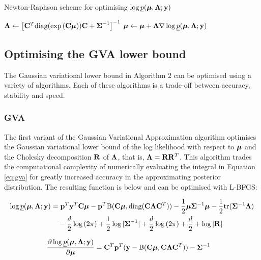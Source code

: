 \documentclass{article}[12pt]
\begin{document}
\begin{algorithm}\label{alg:algorithm_three}
\caption[Algorithm 3]{Newton-Raphson scheme for optimising $\log \underline{p}({\boldsymbol \mu}, {\boldsymbol \Lambda}; {\bf y})$}
\begin{algorithmic}
\STATE ${\boldsymbol \Lambda} \leftarrow \left [{\bf C}^T \text{diag}(\exp{({\bf C}{\boldsymbol\mu})}) {\bf C} + {\boldsymbol \Sigma}^{-1} \right ]^{-1}$
\STATE ${\boldsymbol \mu} \leftarrow {\boldsymbol\mu} + {\boldsymbol \Lambda} \nabla \log \underline{p}({\boldsymbol \mu}, {\boldsymbol \Lambda}; {\bf y})$
\ENDWHILE
\end{algorithmic}
\end{algorithm}

\subsection{Optimising the GVA lower bound}
The Gaussian variational lower bound in Algorithm 2 can be optimised using a 
variety of algorithms. Each of these algorithms is a trade-off between accuracy, 
stability and speed.

\subsubsection{GVA}
The first variant of the Gaussian Variational Approximation algorithm
optimises the Gaussian variational lower bound of the log likelihood with respect
to ${\boldsymbol \mu}$ and the Cholesky decomposition ${\bf R}$ of ${\boldsymbol \Lambda}$, that is,
${\boldsymbol \Lambda} = {\bf R} {\bf R}^T$. This algorithm trades the computational complexity of 
numerically evaluating the integral in Equation \ref{eq:gva} for greatly increased 
accuracy in the approximating posterior distribution. The resulting function is below and 
can be optimised with L-BFGS:

\begin{align}\label{eq:gva}
\log \underline{p}({\boldsymbol \mu}, {\boldsymbol \Lambda}; {\bf y}) &= {\bf p}^T{\bf y}^T{\bf C} {\boldsymbol \mu} - {\bf p}^T {\text{B}}({\bf C} {\boldsymbol \mu}, \text{diag}({\bf C} {\boldsymbol \Lambda} {\bf C}^T)) - {\frac{1}{2}} {\boldsymbol \mu} {\boldsymbol \Sigma}^{-1} {\boldsymbol \mu} - {\frac{1}{2}} \text{tr}{({\boldsymbol\Sigma}^{-1} {\boldsymbol\Lambda})} \\
&\quad - \frac{d}{2} \log{(2 \pi)} + {\frac{1}{2}} \log{|{\boldsymbol\Sigma}^{-1}|} + \frac{d}{2} \log{(2 \pi)} + \frac{d}{2} + \log{|{\bf R}|}
\end{align}

\begin{align*}
\frac{\partial \log \underline{p}({\boldsymbol \mu}, {\boldsymbol \Lambda}; {\bf y})}{\partial {\boldsymbol\mu}} &= {\bf C}^T {\bf p}^T({\bf y} - {\text{B}}({\bf C} {\boldsymbol \mu}, {\bf C} {\boldsymbol \Lambda} {\bf C}^T)) - {\boldsymbol \Sigma}^{-1}
\end{align*}
\end{document}
